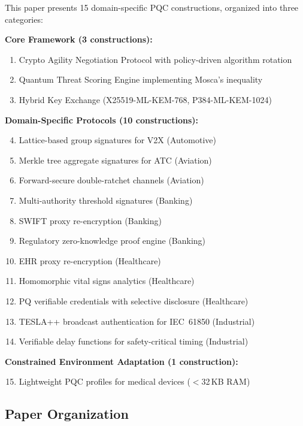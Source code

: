 \documentclass[conference,10pt]{IEEEtran}
\newcommand{\mlkem}{\textsf{ML-KEM}}
\begin{document}
This paper presents 15 domain-specific PQC constructions, organized into three categories:

\noindent\textbf{Core Framework (3 constructions):}
\begin{enumerate}
    \item Crypto Agility Negotiation Protocol with policy-driven algorithm rotation
    \item Quantum Threat Scoring Engine implementing Mosca's inequality~\cite{mosca2018}
    \item Hybrid Key Exchange (X25519-\mlkem{}-768, P384-\mlkem{}-1024)
\end{enumerate}

\noindent\textbf{Domain-Specific Protocols (10 constructions):}
\begin{enumerate}\setcounter{enumi}{3}
    \item Lattice-based group signatures for V2X (Automotive)
    \item Merkle tree aggregate signatures for ATC (Aviation)
    \item Forward-secure double-ratchet channels (Aviation)
    \item Multi-authority threshold signatures (Banking)
    \item SWIFT proxy re-encryption (Banking)
    \item Regulatory zero-knowledge proof engine (Banking)
    \item EHR proxy re-encryption (Healthcare)
    \item Homomorphic vital signs analytics (Healthcare)
    \item PQ verifiable credentials with selective disclosure (Healthcare)
    \item TESLA++ broadcast authentication for IEC~61850 (Industrial)
    \item Verifiable delay functions for safety-critical timing (Industrial)
\end{enumerate}

\noindent\textbf{Constrained Environment Adaptation (1 construction):}
\begin{enumerate}\setcounter{enumi}{14}
    \item Lightweight PQC profiles for medical devices ($<$32\,KB RAM)
\end{enumerate}

\subsection{Paper Organization}
\end{document}

